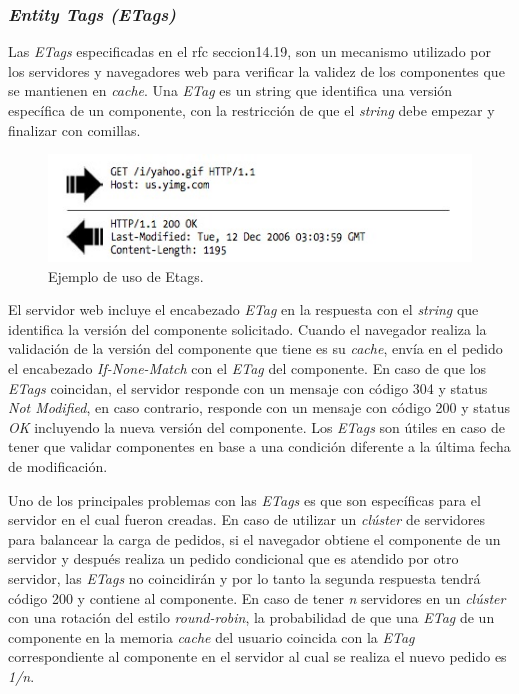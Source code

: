 \subsubsection{\emph{Entity Tags (ETags)}}
Las \emph{ETags} especificadas en el rfc \cite{rfc2616} seccion14.19, son un mecanismo utilizado por los servidores y navegadores web para verificar la validez de los componentes
que se mantienen en \emph{cache}. Una \emph{ETag} es un string que identifica una versión específica de un componente, con la restricción de que el \emph{string} debe empezar
y finalizar con comillas.

\begin{figure}[h!]
\centering
\includegraphics[scale=0.5]{figuras/hpws/etags.jpg}
	\caption{Ejemplo de uso de Etags.}
    \label{fig.redirect}
\end{figure}

El servidor web incluye el encabezado \emph{ETag} en la respuesta con el \emph{string} que identifica la versión del componente solicitado. Cuando el navegador realiza la
validación de la versión del componente que tiene es su \emph{cache}, envía en el pedido el encabezado \emph{If-None-Match} con el \emph{ETag} del componente. En caso de que
los \emph{ETags} coincidan, el servidor responde con un mensaje con código 304 y status \emph{Not Modified}, en caso contrario, responde con un mensaje con código 200
y status \emph{OK} incluyendo la nueva versión del componente. Los \emph{ETags} son útiles en caso de tener que validar componentes en base a una condición diferente
a la última fecha de modificación.

Uno de los principales problemas con las \emph{ETags} es que son específicas para el servidor en el cual fueron creadas. En caso de utilizar un \emph{clúster} de servidores para
balancear la carga de pedidos, si el navegador obtiene el componente de un servidor y después realiza un pedido condicional que es atendido por otro servidor, las
\emph{ETags} no coincidirán y por lo tanto la segunda respuesta tendrá código 200 y contiene al componente.
En caso de tener \emph{n} servidores en un \emph{clúster} con una rotación del estilo \emph{round-robin}, la probabilidad de que una \emph{ETag} de un componente en la memoria
\emph{cache} del usuario coincida con la \emph{ETag} correspondiente al componente en el servidor al cual se realiza el nuevo pedido es \emph{1/n}.

